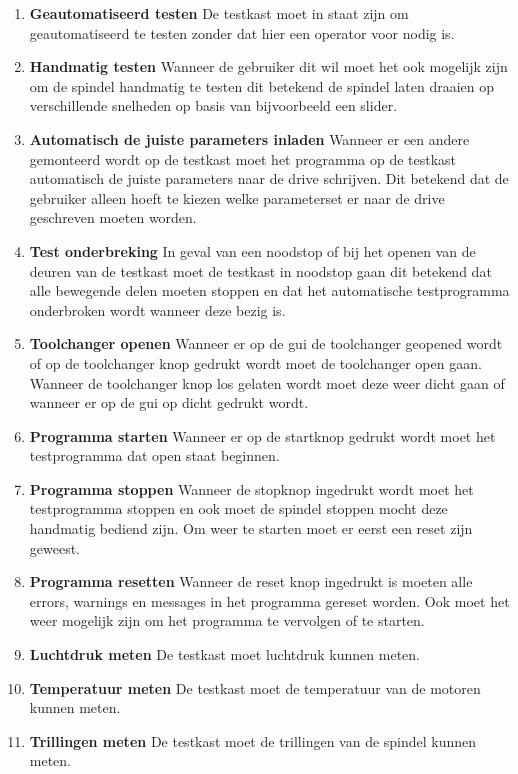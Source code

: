 \begin{enumerate}
	\item \textbf{Geautomatiseerd testen} De testkast moet in staat zijn om geautomatiseerd te testen zonder dat hier een operator voor nodig is.
	\item \textbf{Handmatig testen} Wanneer de gebruiker dit wil moet het ook mogelijk zijn om de spindel handmatig te testen dit betekend de spindel laten draaien op verschillende snelheden op basis van bijvoorbeeld een slider.
	\item \textbf{Automatisch de juiste parameters inladen} Wanneer er een andere gemonteerd wordt op de testkast moet het programma op de testkast automatisch de juiste parameters naar de drive schrijven. Dit betekend dat de gebruiker alleen hoeft te kiezen welke parameterset er naar de drive geschreven moeten worden.
	\item \textbf{Test onderbreking} In geval van een noodstop of bij het openen van de deuren van de testkast moet de testkast in noodstop gaan dit betekend dat alle bewegende delen moeten stoppen en dat het automatische testprogramma onderbroken wordt wanneer deze bezig is.
	\item \textbf{Toolchanger openen} Wanneer er op de \gls{gui} de toolchanger geopened wordt of op de toolchanger knop gedrukt wordt moet de toolchanger open gaan. Wanneer de toolchanger knop los gelaten wordt moet deze weer dicht gaan of wanneer er op de \gls{gui} op dicht gedrukt wordt.
	\item \textbf{Programma starten} Wanneer er op de startknop gedrukt wordt moet het testprogramma dat open staat beginnen.
	\item \textbf{Programma stoppen} Wanneer de stopknop ingedrukt wordt moet het testprogramma stoppen en ook moet de spindel stoppen mocht deze handmatig bediend zijn. Om weer te starten moet er eerst een reset zijn geweest.
	\item \textbf{Programma resetten} Wanneer de reset knop ingedrukt is moeten alle errors, warnings en messages in het programma gereset worden. Ook moet het weer mogelijk zijn om het programma te vervolgen of te starten.
	\item \textbf{Luchtdruk meten} De testkast moet luchtdruk kunnen meten.
	\item \textbf{Temperatuur meten} De testkast moet de temperatuur van de motoren kunnen meten.
	\item \textbf{Trillingen meten} De testkast moet de trillingen van de spindel kunnen meten.
\end{enumerate}

